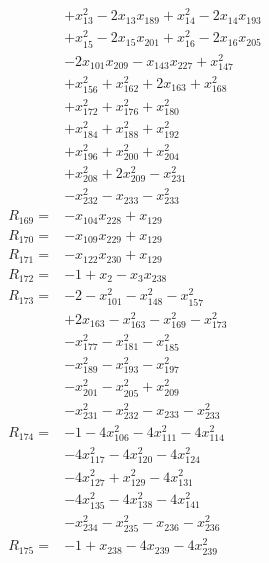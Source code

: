\begin{align*}
&+x_{13}^{2} -2x_{13}x_{189} +x_{14}^{2} -2x_{14}x_{193}\\
&+x_{15}^{2} -2x_{15}x_{201} +x_{16}^{2} -2x_{16}x_{205}\\
&-2x_{101}x_{209} -x_{143}x_{227} +x_{147}^{2}\\
&+x_{156}^{2} +x_{162}^{2} +2x_{163} +x_{168}^{2}\\
&+x_{172}^{2} +x_{176}^{2} +x_{180}^{2}\\
&+x_{184}^{2} +x_{188}^{2} +x_{192}^{2}\\
&+x_{196}^{2} +x_{200}^{2} +x_{204}^{2}\\
&+x_{208}^{2} +2x_{209}^{2} -x_{231}^{2}\\
&-x_{232}^{2} -x_{233} -x_{233}^{2}\\[3pt]
R_{169}={}&-x_{104}x_{228} +x_{129}\\[3pt]
R_{170}={}&-x_{109}x_{229} +x_{129}\\[3pt]
R_{171}={}&-x_{122}x_{230} +x_{129}\\[3pt]
R_{172}={}&-1 +x_{2} -x_{3}x_{238}\\[3pt]
R_{173}={}&-2 -x_{101}^{2} -x_{148}^{2} -x_{157}^{2}\\
&+2x_{163} -x_{163}^{2} -x_{169}^{2} -x_{173}^{2}\\
&-x_{177}^{2} -x_{181}^{2} -x_{185}^{2}\\
&-x_{189}^{2} -x_{193}^{2} -x_{197}^{2}\\
&-x_{201}^{2} -x_{205}^{2} +x_{209}^{2}\\
&-x_{231}^{2} -x_{232}^{2} -x_{233} -x_{233}^{2}\\[3pt]
R_{174}={}&-1 -4x_{106}^{2} -4x_{111}^{2} -4x_{114}^{2}\\
&-4x_{117}^{2} -4x_{120}^{2} -4x_{124}^{2}\\
&-4x_{127}^{2} +x_{129}^{2} -4x_{131}^{2}\\
&-4x_{135}^{2} -4x_{138}^{2} -4x_{141}^{2}\\
&-x_{234}^{2} -x_{235}^{2} -x_{236} -x_{236}^{2}\\[3pt]
R_{175}={}&-1 +x_{238} -4x_{239} -4x_{239}^{2}\\[3pt]
\end{align*}
